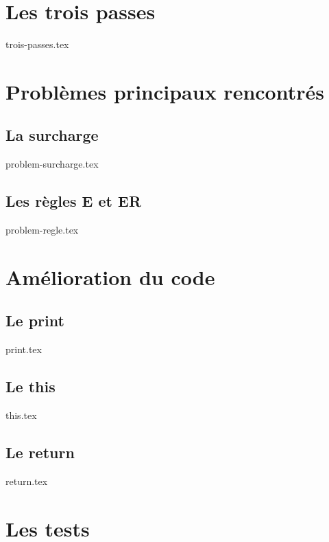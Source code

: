 \documentclass[12pt]{article}
\begin{document}
\section{Les trois passes}
		{trois-passes.tex}	
\newpage
\section{Problèmes principaux rencontrés}
 	\subsection{La surcharge}
		{problem-surcharge.tex}
	\subsection{Les règles E et ER}
		{problem-regle.tex}
\newpage
\section{Amélioration du code}

	\subsection{Le print}
		{print.tex}

	\subsection{Le this}
		{this.tex}
	\subsection{Le return}
		{return.tex}
\newpage
\section{Les tests}
\end{document}
